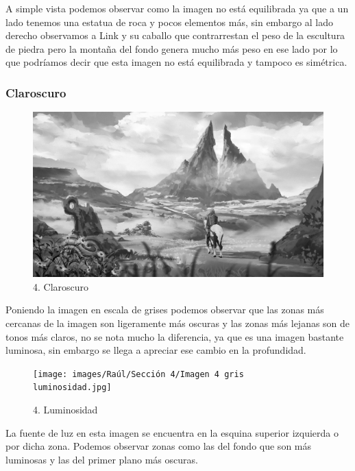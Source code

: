 \documentclass[12pt]{article}
\begin{document}
A simple vista podemos observar como la imagen no está equilibrada ya que a un lado tenemos una estatua de roca y pocos elementos más, sin embargo al lado derecho observamos a Link y su caballo que contrarrestan el peso de la escultura de piedra pero la montaña del fondo genera mucho más peso en ese lado por lo que podríamos decir que esta imagen no está equilibrada y tampoco es simétrica.


        \subsubsection{Claroscuro}

\begin{figure}[H]
      \centering
      \includegraphics[width=\textwidth]{images/Raúl/Sección 4/Imagen 4 gris.jpg}
      \caption{\small 4. Claroscuro}
\end{figure} 

Poniendo la imagen en escala de grises podemos observar que las zonas más cercanas de la imagen son ligeramente más oscuras y las zonas más lejanas son de tonos más claros, no se nota mucho la diferencia, ya que es una imagen bastante luminosa, sin embargo se llega a apreciar ese cambio en la profundidad.

\begin{figure}[H]
      \centering
      \texttt{[image: images/Raúl/Sección 4/Imagen 4 gris luminosidad.jpg]}
      \caption{\small 4. Luminosidad}
\end{figure}

La fuente de luz en esta imagen se encuentra en la esquina superior izquierda o por dicha zona. Podemos observar zonas como las del fondo que son más luminosas y las del primer plano más oscuras.
\end{document}
